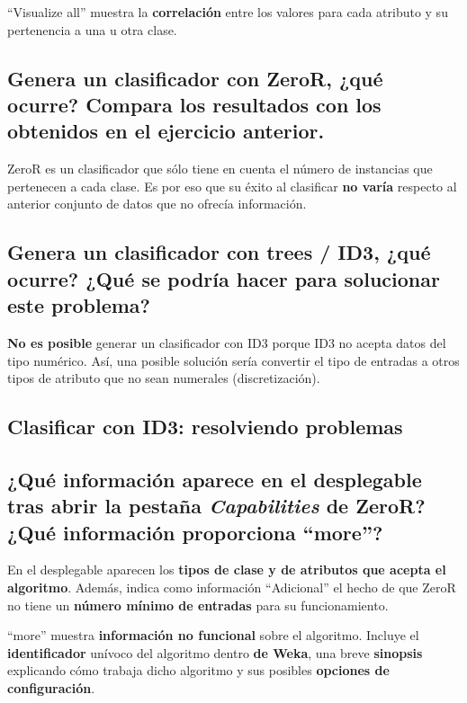 \documentclass[12pt]{article}
\begin{document}
``Visualize all'' muestra la \textbf{correlación} entre los valores para cada
atributo y su pertenencia a una u otra clase.

\subsection*{\small Genera un clasificador con ZeroR, ¿qué ocurre? Compara los
resultados con los obtenidos en el ejercicio anterior.}

ZeroR es un clasificador que sólo tiene en cuenta el número de instancias
que pertenecen a cada clase. Es por eso que su éxito al clasificar \textbf{no
varía} respecto al anterior conjunto de datos que no ofrecía información.

\subsection*{\small Genera un clasificador con trees / ID3, ¿qué ocurre? ¿Qué se
podría hacer para solucionar este problema?}

\textbf{No es posible} generar un clasificador con ID3 porque ID3 no acepta
datos del tipo numérico. Así, una posible solución sería convertir el tipo de
entradas a otros tipos de atributo que no sean numerales (discretización).

\newpage

\begin{center}
\section{Clasificar con ID3: resolviendo problemas}
\end{center}

\subsection*{\small ¿Qué información aparece en el desplegable tras abrir la
pestaña \emph{Capabilities} de ZeroR? ¿Qué información proporciona ``more''?}

En el desplegable aparecen los \textbf{tipos de clase y de atributos que acepta
el algoritmo}. Además, indica como información ``Adicional'' el hecho de que
ZeroR no tiene un \textbf{número mínimo de entradas} para su funcionamiento.

``more'' muestra \textbf{información no funcional} sobre el algoritmo. Incluye
el \textbf{identificador} unívoco del algoritmo dentro \textbf{de Weka}, una
breve \textbf{sinopsis} explicando cómo trabaja dicho algoritmo y sus posibles
\textbf{opciones de configuración}.
\end{document}

